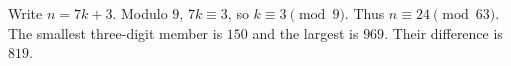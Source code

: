 Write $n=7k+3$. Modulo $9$, $7k\equiv3$, so $k\equiv3\pmod9$. Thus $n\equiv24\pmod{63}$. The smallest three-digit member is $150$ and the largest is $969$. Their difference is $\boxed{819}$.
